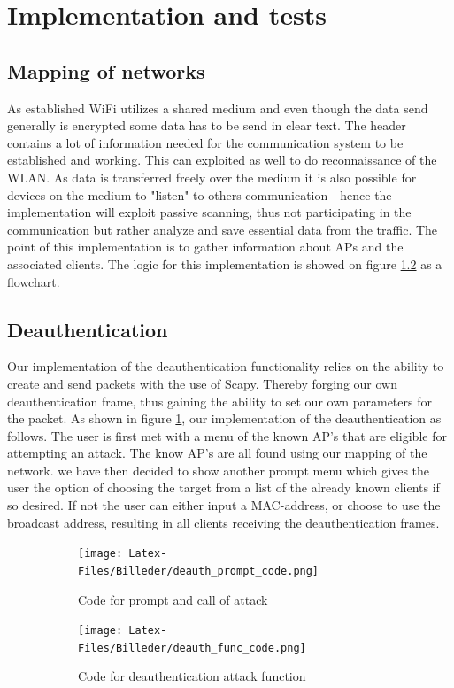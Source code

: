 \section{Implementation and tests}

\subsection{Mapping of networks}
As established WiFi utilizes a shared medium and even though the data send generally is encrypted some data has to be send in clear text. The header contains a lot of information needed for the communication system to be established and working. This can exploited as well to do reconnaissance of the WLAN. As data is transferred freely over the medium it is also possible for devices on the medium to "listen" to others communication - hence the implementation will exploit passive scanning, thus not participating in the communication but rather analyze and save essential data from the traffic. The point of this implementation is to gather information about APs and the associated clients. The logic for this implementation is showed on figure \ref{} as a flowchart.




\subsection{Deauthentication}
Our implementation of the deauthentication functionality relies on the ability to create and send packets with the use of Scapy. Thereby forging our own deauthentication frame, thus gaining the ability to set our own parameters for the packet.
As shown in figure \ref{deauth_prompt_code}, our implementation of the deauthentication as follows. 
The user is first met with a menu of the known AP's that are eligible for attempting an attack. The know AP's are all found using our mapping of the network.
we have then decided to show another prompt menu which gives the user the option of choosing the target from a list of the already known clients if so desired. If not the user can either input a MAC-address, or choose to use the broadcast address, resulting in all clients receiving the deauthentication frames. 

\begin{figure}[!htbp]
     \centering
     \begin{subfigure}{0.49\textwidth}
         \centering
         \texttt{[image: Latex-Files/Billeder/deauth\_prompt\_code.png]}
         \caption{Code for prompt and call of attack}
         \label{deauth_prompt_code}
     \end{subfigure}
     \hfill
     \begin{subfigure}{0.49\textwidth}
         \centering
         \texttt{[image: Latex-Files/Billeder/deauth\_func\_code.png]}
         \caption{Code for deauthentication attack function}
         \label{deauth_func_code}
     \end{subfigure}
     \hfill
     \caption{}
\end{figure}

